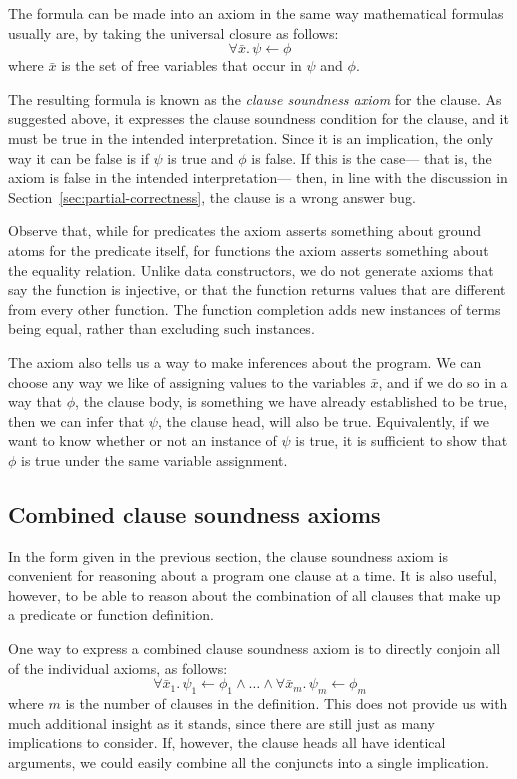The formula can be made into an axiom
in the same way mathematical formulas usually are,
by taking the universal closure as follows:
\[ \forall \bar{x}.\, \psi \leftarrow \phi \]
where $\bar{x}$ is the set of free variables
that occur in $\psi$ and $\phi$.

The resulting formula is known as
the \emph{clause soundness axiom}
for the clause.
As suggested above,
it expresses the clause soundness condition for the clause,
and it must be true in the intended interpretation.
Since it is an implication,
the only way it can be false
is if $\psi$ is true and $\phi$ is false.
If this is the case---%
that is, the axiom is false in the intended interpretation---%
then, in line with the discussion in Section~\ref{sec:partial-correctness},
the clause is a wrong answer bug.

Observe that,
while for predicates the axiom asserts
something about ground atoms for the predicate itself,
for functions the axiom asserts
something about the equality relation.
Unlike data constructors,
we do not generate axioms that say
the function is injective,
or that the function returns values
that are different from every other function.
The function completion adds new instances of terms being equal,
rather than excluding such instances.

The axiom also tells us a way to make inferences about the program.
We can choose any way we like
of assigning values to the variables $\bar{x}$,
and if we do so in a way that $\phi$, the clause body,
is something we have already established to be true,
then we can infer that $\psi$, the clause head,
will also be true.
Equivalently,
if we want to know whether or not an instance of $\psi$ is true,
it is sufficient to show that $\phi$ is true
under the same variable assignment.


\subsection{Combined clause soundness axioms}
\label{sec:ax-combined}

In the form given in the previous section,
the clause soundness axiom is convenient
for reasoning about a program one clause at a time.
It is also useful, however,
to be able to reason about the combination of all clauses
that make up a predicate or function definition.

One way to express a combined clause soundness axiom
is to directly conjoin all of the individual axioms,
as follows:
\[
    \forall \bar{x}_1.\, \psi_1 \leftarrow \phi_1
    \land \ldots \land
    \forall \bar{x}_m.\, \psi_m \leftarrow \phi_m
\]
where $m$ is the number of clauses in the definition.
This does not provide us with much additional insight as it stands,
since there are still just as many implications to consider.
If, however,
the clause heads all have identical arguments,
we could easily combine all the conjuncts
into a single implication.

